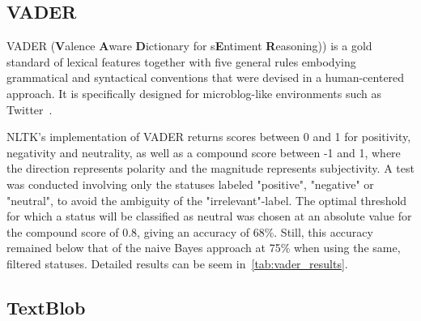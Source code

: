 \subsection{VADER}
\label{subsec:vader}

VADER (\textbf{V}alence \textbf{A}ware \textbf{D}ictionary for s\textbf{E}ntiment \textbf{R}easoning))
is a gold standard of lexical features together with five general rules embodying grammatical and syntactical conventions
that were devised in a human-centered approach.
It is specifically designed for microblog-like environments such as Twitter~\cite{Hutto2014}.
\par
NLTK's implementation of VADER returns scores between 0 and 1 for positivity, negativity and neutrality,
as well as a compound score between -1 and 1, where the direction represents polarity and the magnitude represents subjectivity.
A test was conducted involving only the statuses labeled "positive", "negative" or "neutral",
to avoid the ambiguity of the "irrelevant"-label.
The optimal threshold for which a status will be classified as neutral was chosen
at an absolute value for the compound score of 0.8, giving an accuracy of 68\%.
Still, this accuracy remained below that of the naive Bayes approach at 75\% when using the same, filtered statuses.
Detailed results can be seem in~\ref{tab:vader_results}.

\begin{table}
    \caption{Sentiment classification using VADER}
    \label{tab:vader_results}
\end{table}

\subsection{TextBlob}
\label{subsec:textblob}

